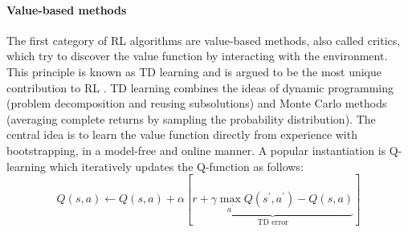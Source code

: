 \documentclass[\home/main.tex]{subfiles}
\begin{document}
\paragraph{Value-based methods}
The first category of RL algorithms are value-based methods, also called critics, which try to discover the value function by interacting with the environment. This principle is known as \gls{TD} learning \autocite{boyan2002technical} and is argued to be the most unique contribution to RL \autocite{Sutton2018}. \gls{TD} learning combines the ideas of dynamic programming (problem decomposition and reusing subsolutions) and Monte Carlo methods (averaging complete returns by sampling the probability distribution). The central idea is to learn the value function directly from experience with bootstrapping, in a model-free and online manner. A popular instantiation is Q-learning \autocite{watkins1992q} which iteratively updates the Q-function as follows:
\begin{equation} \label{eq:q-learning-update-rule}
	Q(s, a) \leftarrow Q(s, a)+\alpha\left[\underbrace{r+\gamma \max _{a^{\prime}} Q\left(s^{\prime}, a^{\prime}\right)-Q(s, a)}_{\text{TD error}}\right]
\end{equation}
\end{document}
